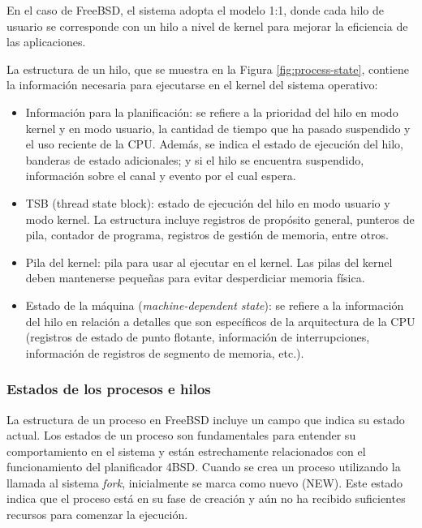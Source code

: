 En el caso de FreeBSD, el sistema adopta el modelo 1:1, donde cada hilo de usuario se corresponde con un hilo a nivel de kernel para mejorar la eficiencia de las aplicaciones.\par

La estructura de un hilo, que se muestra en la Figura \ref{fig:process-state}, contiene la información necesaria para ejecutarse en el kernel del sistema operativo:

\begin{itemize}
    \item Información para la planificación: se refiere a la prioridad del hilo en modo kernel y en modo usuario, la cantidad de tiempo que ha pasado suspendido y el uso reciente de la CPU. Además, se indica el estado de ejecución del hilo, banderas de estado adicionales; y si el hilo se encuentra suspendido, información sobre el canal y evento por el cual espera.
    \item TSB (thread state block): estado de ejecución del hilo en modo usuario y modo kernel. La estructura incluye registros de propósito general, punteros de pila, contador de programa, registros de gestión de memoria, entre otros.
    \item Pila del kernel: pila para usar al ejecutar en el kernel. Las pilas del kernel deben mantenerse pequeñas para evitar desperdiciar memoria física.
    \item Estado de la máquina (\textit{machine-dependent state}): se refiere a la información del hilo en relación a detalles que son específicos de la arquitectura de la CPU (registros de estado de punto flotante, información de interrupciones, información de registros de segmento de memoria, etc.).
\end{itemize}

\subsubsection{Estados de los procesos e hilos}

La estructura de un proceso en FreeBSD incluye un campo que indica su estado actual. Los estados de un proceso son fundamentales para entender su comportamiento en el sistema y están estrechamente relacionados con el funcionamiento del planificador 4BSD. Cuando se crea un proceso utilizando la llamada al sistema \textit{fork}, inicialmente se marca como nuevo (NEW). Este estado indica que el proceso está en su fase de creación y aún no ha recibido suficientes recursos para comenzar la ejecución.

